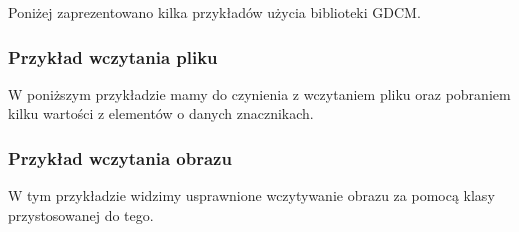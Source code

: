 Poniżej zaprezentowano kilka przykładów użycia biblioteki GDCM.

\newpage
\subsubsection{Przykład wczytania pliku}

W poniższym przykładzie mamy do czynienia z wczytaniem pliku oraz pobraniem kilku wartości z elementów o danych znacznikach.




\newpage
\subsubsection{Przykład wczytania obrazu}

W tym przykładzie widzimy usprawnione wczytywanie obrazu za pomocą klasy przystosowanej do tego.



